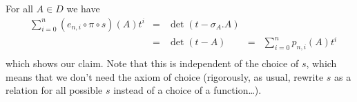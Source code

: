 \begin{example}
  For all $A\in D$ we have
  \begin{equation}
    \begin{aligned}
      &\sum_{i=0}^n (e_{n,i} \circ \pi \circ s)(A)t^i&=&\operatorname{det}(t-\sigma_A.A)\\
      &&=&\operatorname{det}(t-A)
      &=&\sum_{i=0}^n p_{n,i}(A)t^i\\
    \end{aligned}
  \end{equation}
  which shows our claim.
  Note that this is independent of the choice of $s$, which means that we don't need the axiom of choice (rigorously, as usual, rewrite $s$ as a relation for all possible $s$ instead of a choice of a function\ldots).
\end{example}

